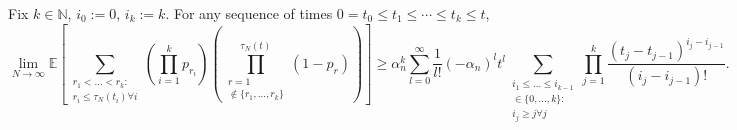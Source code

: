 \documentclass{article}
\newcommand{\E}{\mathbb{E}}
\newcommand{\1}[1]{\mathbbm{1}_{#1}}
\begin{document}
\begin{lemma}\label{thm:inductionLB}
Fix $k \in \mathbb{N}$, $i_0:=0$, $i_k:=k$. For any sequence of times
$0 = t_0 \leq t_1 \leq \cdots \leq t_k \leq t$,
\begin{equation}
\lim_{N\to\infty} \E \left[ 
        \sum_{\substack{r_1 <\dots< r_k :\\ r_i \leq \tau_N(t_i) \forall i}}
        \left( \prod_{i=1}^k p_{r_i} \right)
        \left( \prod_{\substack{r=1 \\ \notin \{r_1,\dots,r_k\} }}^{\tau_N(t)} 
        (1-p_r) \right) \right]
\geq \alpha_n^k \sum_{l=0}^\infty \frac{1}{l!} (-\alpha_n)^l t^l 
        \sum_{\substack{i_1\leq \dots\leq i_{k-1}\\ \in \{0,\dots,k\} :
        \\ i_j \geq j \forall j}} 
        \prod_{j=1}^k \frac{(t_j - t_{j-1})^{i_j - i_{j-1}}}{(i_j - i_{j-1})! } .
\end{equation}
\end{lemma}
\end{document}
